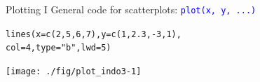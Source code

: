 \documentclass[xcolor=table,           xcolor=dvipsnames]{beamer}\usepackage[]{graphicx}\usepackage[]{color}
\makeatletter
\newcommand{\hlnum}[1]{\textcolor[rgb]{0,0,0}{#1}}
\newcommand{\hlstr}[1]{\textcolor[rgb]{0.545,0.137,0.137}{#1}}
\newcommand{\hlopt}[1]{\textcolor[rgb]{0,0,0}{#1}}
\newcommand{\hlstd}[1]{\textcolor[rgb]{0,0,0}{#1}}
\newcommand{\hlkwc}[1]{\textcolor[rgb]{1,0,1}{#1}}
\newcommand{\hlkwd}[1]{\textcolor[rgb]{0,0,1}{#1}}
\newenvironment{kframe}{%
 \def\at@end@of@kframe{}%
 \ifinner\ifhmode%
  \def\at@end@of@kframe{\end{minipage}}%
  \begin{minipage}{\columnwidth}%
 \fi\fi%
 \def\FrameCommand##1{\hskip\@totalleftmargin \hskip-\fboxsep
 \colorbox{shadecolor}{##1}\hskip-\fboxsep
     \hskip-\linewidth \hskip-\@totalleftmargin \hskip\columnwidth}%
 \MakeFramed {\advance\hsize-\width
   \@totalleftmargin\z@ \linewidth\hsize
   \@setminipage}}%
 {\par\unskip\endMakeFramed%
 \at@end@of@kframe}
\newenvironment{knitrout}{}{} %
\newcommand{\rcode}[1]{\texttt{\textcolor{Blue}{#1}}} %
\makeatother
\begin{document}
\begin{frame}[fragile]{Plotting I}
General code for scatterplots: \rcode{plot(x, y, ...)}
\begin{knitrout}
\color{fgcolor}\begin{kframe}
\begin{alltt}
\hlkwd{lines}\hlstd{(}\hlkwc{x}\hlstd{=}\hlkwd{c}\hlstd{(}\hlnum{2}\hlstd{,}\hlnum{5}\hlstd{,}\hlnum{6}\hlstd{,}\hlnum{7}\hlstd{),} \hlkwc{y}\hlstd{=}\hlkwd{c}\hlstd{(}\hlnum{1}\hlstd{,}\hlnum{2.3}\hlstd{,}\hlopt{-}\hlnum{3}\hlstd{,}\hlnum{1}\hlstd{),}
      \hlkwc{col}\hlstd{=}\hlnum{4}\hlstd{,} \hlkwc{type}\hlstd{=}\hlstr{"b"}\hlstd{,} \hlkwc{lwd}\hlstd{=}\hlnum{5}\hlstd{)}
\end{alltt}
\end{kframe}

{\centering \texttt{[image: ./fig/plot\_indo3-1]} 

}



\end{knitrout}
\end{frame}

\end{document}
